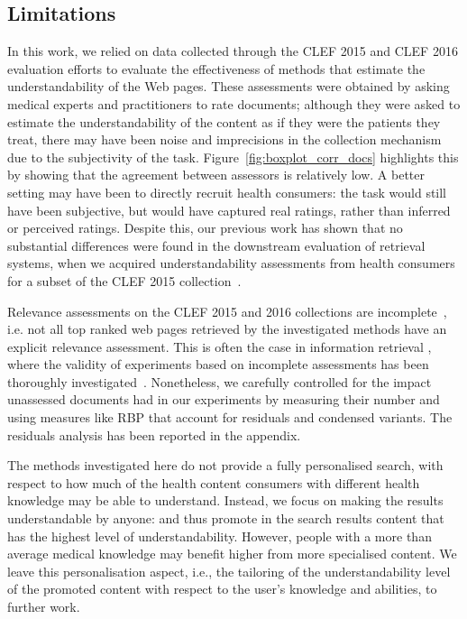 \documentclass[10pt,a4paper]{article}
\begin{document}
\subsection*{Limitations}
In this work, we relied on data collected through the CLEF 2015 and CLEF 2016 evaluation efforts to evaluate the effectiveness of methods that estimate the understandability of the Web pages. These assessments were obtained by asking medical experts and practitioners to rate documents;  although they were asked to estimate the understandability of the content as if they were the patients they treat, there may have been noise and imprecisions in the collection mechanism due to the subjectivity of the
task. Figure~\ref{fig:boxplot_corr_docs} highlights this by showing that the agreement between assessors is relatively low. A better setting may have been to directly recruit health consumers: the task would still have been subjective, but would have captured real ratings, rather than inferred or perceived ratings. Despite this, our previous work has shown that no substantial differences were found in the downstream evaluation of retrieval systems, when we acquired understandability assessments from health consumers for a subset of the CLEF 2015 collection~\cite{palotti16b}. 

Relevance assessments on the CLEF 2015 and 2016 collections are incomplete~\cite{clef15,clef16}, i.e. not all top ranked web pages retrieved by the investigated methods have an explicit relevance assessment. This is often the case in information retrieval , where the validity of experiments based on incomplete assessments has been thoroughly investigated~\cite{sanderson2010test}. Nonetheless, we carefully controlled for the impact unassessed documents had in our experiments by measuring their number and using measures like RBP that account for residuals and condensed variants. The residuals analysis has been reported in the appendix. 

The methods investigated here do not provide a fully personalised search, with respect to how much of the health content consumers with different health knowledge may be able to understand. Instead, we focus on making the results understandable by anyone: and thus promote in the search results content that has the highest level of understandability. However, people with a more than average medical knowledge may benefit higher from more specialised content. We leave this personalisation aspect, i.e., the tailoring of the understandability level of the promoted content with respect to the user's knowledge and abilities, to further work.
\end{document}
